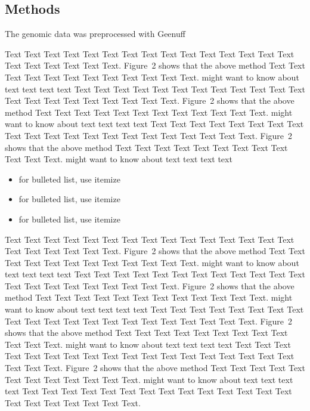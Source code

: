 \documentclass{bioinfo}
\begin{document}
\begin{methods}
\section{Methods}
The genomic data was preprocessed with Geenuff \citealp{Denton19}



Text Text Text Text Text Text  Text Text Text Text Text Text Text
Text Text  Text Text Text Text Text Text.
Figure~2\vphantom{\ref{fig:02}} shows that the above method  Text
Text Text Text  Text Text Text Text Text Text  Text Text.
\citealp{Boffelli03} might want to know about  text text text text
Text Text Text Text Text Text Text Text Text Text Text Text Text
Text Text  Text Text Text Text Text Text.
Figure~2\vphantom{\ref{fig:02}} shows that the above method  Text
Text Text Text Text Text Text Text Text Text  Text Text.
\citealp{Boffelli03} might want to know about text text text text
Text Text Text Text Text Text  Text Text Text Text Text Text Text
Text Text Text Text Text Text Text Text.
Figure~2\vphantom{\ref{fig:02}} shows that the above method  Text
Text Text Text Text Text Text Text Text Text  Text Text.
\citealp{Boffelli03} might want to know about text text text
text\vspace*{1pt}

\begin{itemize}
\item for bulleted list, use itemize
\item for bulleted list, use itemize
\item for bulleted list, use itemize\vspace*{1pt}
\end{itemize}

Text Text Text Text Text Text  Text Text Text Text Text Text Text
Text Text  Text Text Text Text Text Text.
Figure~2\vphantom{\ref{fig:02}} shows that the above method  Text
Text Text Text  Text Text Text Text Text Text  Text Text.
\citealp{Boffelli03} might want to know about  text text text text
Text Text Text Text Text Text Text Text Text Text Text Text Text
Text Text Text Text Text Text Text Text.
Figure~2\vphantom{\ref{fig:02}} shows that the above method  Text
Text Text Text Text Text Text Text Text Text  Text Text.
\citealp{Boffelli03} might want to know about text text text text
Text Text Text Text Text Text  Text Text Text Text Text Text Text
Text Text Text Text Text Text Text Text.
Figure~2\vphantom{\ref{fig:02}} shows that the above method  Text
Text Text Text Text Text Text Text Text Text  Text Text.
\citealp{Boffelli03} might want to know about text text text text
Text Text Text Text Text Text  Text Text Text Text Text Text Text
Text Text Text Text Text Text Text Text.
Figure~2\vphantom{\ref{fig:02}} shows that the above method Text
Text Text Text Text Text Text Text Text Text Text Text.
\citealp{Boffelli03} might want to know about text text text text
Text Text Text Text Text Text  Text Text Text Text Text Text Text
Text Text Text Text Text Text Text Text.


\end{methods}
\end{document}
